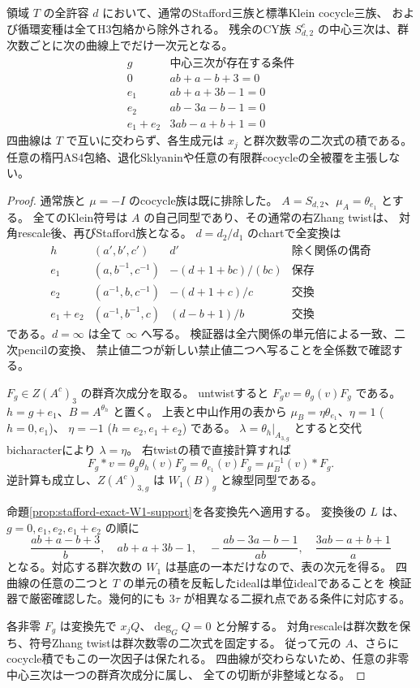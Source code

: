 \begin{theorem}[標準cocycleを含むStafford全族の排除]
\label{thm:all-stafford-cocycle-excluded}
領域 $T$ の全許容 $d$ において、通常のStafford三族と標準Klein cocycle三族、
および循環変種は全てH3包絡から除外される。
残余のCY族 $S_{d,2}^c$ の中心三次は、群次数ごとに次の曲線上でだけ一次元となる。
\[
\begin{array}{c|c}
g&\text{中心三次が存在する条件}\\\hline
0&ab+a-b+3=0\\
e_1&ab+a+3b-1=0\\
e_2&ab-3a-b-1=0\\
e_1+e_2&3ab-a+b+1=0
\end{array}
\]
四曲線は $T$ で互いに交わらず、各生成元は $x_j$ と群次数零の二次式の積である。
任意の楕円AS4包絡、退化Sklyaninや任意の有限群cocycleの全被覆を主張しない。
\end{theorem}
\begin{proof}
通常族と $\mu=-I$ のcocycle族は既に排除した。
$A=S_{d,2}$、$\mu_A=\theta_{e_1}$ とする。
全てのKlein符号は $A$ の自己同型であり、その通常の右Zhang twistは、
対角rescale後、再びStafford族となる。
$d=d_2/d_1$ のchartで全変換は
\[
\begin{array}{c|c|c|c}
h&(a',b',c')&d'&\text{除く関係の偶奇}\\\hline
e_1&(a,b^{-1},c^{-1})&-(d+1+bc)/(bc)&\text{保存}\\
e_2&(a^{-1},b,c^{-1})&-(d+1+c)/c&\text{交換}\\
e_1+e_2&(a^{-1},b^{-1},c)&(d-b+1)/b&\text{交換}
\end{array}
\]
である。$d=\infty$ は全て $\infty$ へ写る。
検証器は全六関係の単元倍による一致、二次pencilの変換、
禁止値二つが新しい禁止値二つへ写ることを全係数で確認する。

$F_g\in Z(A^c)_3$ の群斉次成分を取る。
untwistすると $F_gv=\theta_g(v)F_g$ である。
$h=g+e_1$、$B=A^{\theta_h}$ と置く。
上表と中山作用の表から
$\mu_B=\eta\theta_{e_1}$、$\eta=1$ ($h=0,e_1$)、
$\eta=-1$ ($h=e_2,e_1+e_2$) である。
$\lambda=\theta_h|_{A_{3,g}}$ とすると交代bicharacterにより $\lambda=\eta$。
右twistの積で直接計算すれば
\[
 F_g*v=\theta_g\theta_h(v)F_g=\theta_{e_1}(v)F_g
       =\mu_B^{-1}(v)*F_g.
\]
逆計算も成立し、$Z(A^c)_{3,g}$ は $W_1(B)_g$ と線型同型である。

命題\ref{prop:stafford-exact-W1-support}を各変換先へ適用する。
変換後の $L$ は、$g=0,e_1,e_2,e_1+e_2$ の順に
\[
 \frac{ab+a-b+3}{b},\quad ab+a+3b-1,\quad
 -\frac{ab-3a-b-1}{ab},\quad\frac{3ab-a+b+1}{a}
\]
となる。対応する群次数の $W_1$ は基底の一本だけなので、表の次元を得る。
四曲線の任意の二つと $T$ の単元の積を反転したidealは単位idealであることを
検証器で厳密確認した。幾何的にも $3\tau$ が相異なる二捩れ点である条件に対応する。

各非零 $F_g$ は変換先で $x_jQ$、$\deg_GQ=0$ と分解する。
対角rescaleは群次数を保ち、符号Zhang twistは群次数零の二次式を固定する。
従って元の $A$、さらにcocycle積でもこの一次因子は保たれる。
四曲線が交わらないため、任意の非零中心三次は一つの群斉次成分に属し、
全ての切断が非整域となる。
\end{proof}
